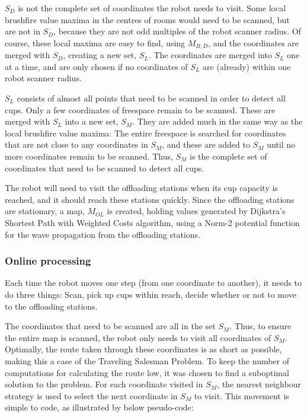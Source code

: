 \(S_{D}\) is not the complete set of coordinates the robot needs to visit.
Some local brushfire value maxima in the centres of rooms would need to be scanned,
but are not in \(S_{D}\), because they are not odd multiples of the robot scanner radius.
Of course, these local maxima are easy to find, using \(M_{B,D}\), and the coordinates
are merged with \(S_{D}\), creating a new set, \(S_{L}\).
The coordinates are merged into \(S_{L}\) one at a time, and are only chosen if no coordinates
of \(S_{L}\) are (already) within one robot scanner radius.

\(S_{L}\) consists of almost all points that need to be scanned in order to detect all cups.
Only a few coordinates of freespace remain to be scanned. These are merged with \(S_{L}\)
into a new set, \(S_{M}\).
They are added much in the same way as the local brushfire value maxima:
The entire freespace is searched for coordinates that are not close to any coordinates in \(S_{M}\),
and these are added to \(S_{M}\) until no more coordinates remain to be scanned.
Thus, \(S_{M}\) is the complete set of coordinates that need to be scanned to detect all cups.


The robot will need to visit the offloading stations when its cup capacity is reached, and it should
reach these stations quickly. Since the offloading stations are stationary, a map, \(M_{OL}\) is created,
holding values generated by Dijkstra's Shortest Path with Weighted Costs algorithm, using a Norm-2 potential function
for the wave propagation from the offloading stations.

\subsubsection{Online processing}

Each time the robot moves one step (from one coordinate to another),
it needs to do three things: Scan, pick up cups within reach, decide whether or not to move to the offloading stations.

The coordinates that need to be scanned are all in the set \(S_{M}\).
Thus, to ensure the entire map is scanned, the robot only needs to visit all coordinates of  \(S_{M}\).
Optimally, the route taken through these coordinates is as short as possible,
making this a case of the Traveling Salesman Problem.
To keep the number of computations for calculating the route low, it was chosen to find a suboptimal solution to the problem.
For each coordinate visited in \(S_{M}\), the nearest neighbour strategy is used to select the next coordinate in \(S_{M}\) to visit.
This movement is simple to code, as illustrated by below pseudo-code:

